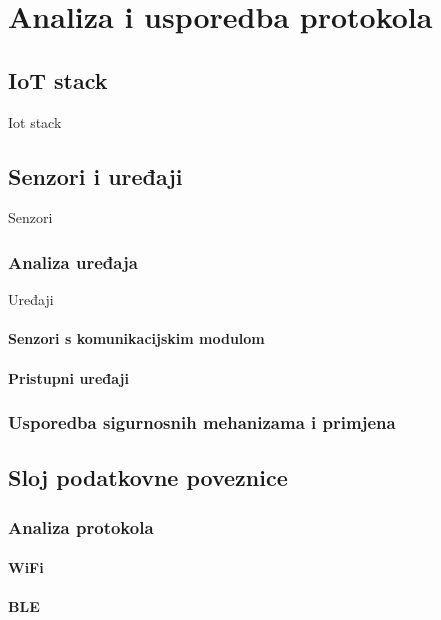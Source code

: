 \documentclass[times, utf8, diplomski]{fer}
\begin{document}
\chapter{Analiza i usporedba protokola}

\section{IoT stack}
Iot stack

\section{Senzori i uređaji}
Senzori

\subsection{Analiza uređaja}
Uređaji

\subsubsection{Senzori s komunikacijskim modulom}

\subsubsection{Pristupni uređaji}

\subsection{Usporedba sigurnosnih mehanizama i primjena}

\section{Sloj podatkovne poveznice}

\subsection{Analiza protokola}

\subsubsection{WiFi}

\subsubsection{BLE}
\end{document}
